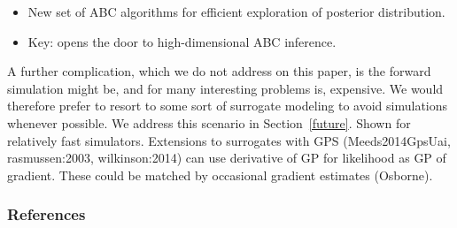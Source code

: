 \documentclass[]{article}
\begin{document}
\begin{itemize}
  \item New set of ABC algorithms for efficient exploration of posterior distribution.
  \item Key: opens the door to high-dimensional ABC inference.
\end{itemize}

A further complication, which we do not address on this paper, is the forward simulation might be, and for many interesting problems is, expensive.  We would therefore prefer to resort to some sort of surrogate modeling \cite{Meeds2014GpsUai,wilkinson:2014, michael} to avoid simulations whenever possible. We address this scenario in Section~\ref{future}.  Shown for relatively fast simulators.  Extensions to surrogates with GPS (Meeds2014GpsUai, rasmussen:2003, wilkinson:2014) can use derivative of GP for likelihood as GP of gradient.  These could be matched by occasional gradient estimates (Osborne).

\subsubsection*{References}
{


}
\end{document}
